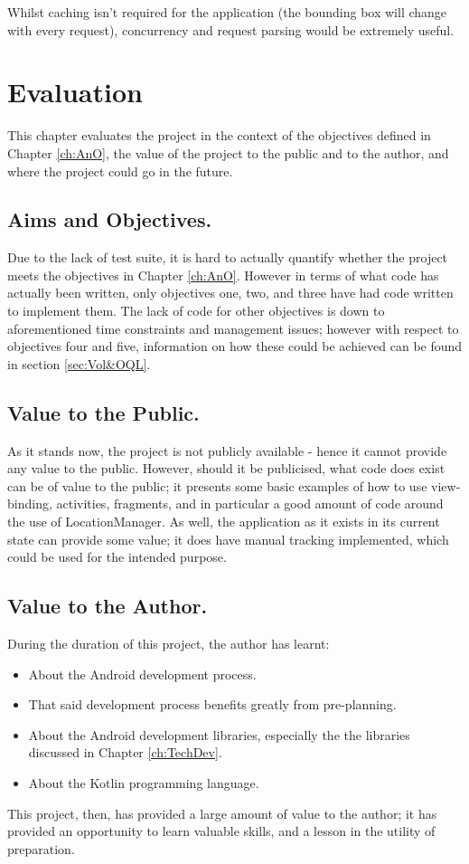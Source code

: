 \documentclass[11pt, a4paper, notitlepage]{report}
\begin{document}
Whilst caching isn't required for the application (the bounding box will change with every request), concurrency and request parsing would be extremely useful.

\chapter{Evaluation}
This chapter evaluates the project in the context of the objectives defined in Chapter \ref{ch:AnO}, the value of the project to the public and to the author, and where the project could go in the future.

\section{Aims and Objectives.}
Due to the lack of test suite, it is hard to actually quantify whether the project meets the objectives in Chapter \ref{ch:AnO}. However in terms of what code has actually been written, only objectives one, two, and three have had code written to implement them. The lack of code for other objectives is down to aforementioned time constraints and management issues; however with respect to objectives four and five, information on how these could be achieved can be found in section \ref{sec:Vol&OQL}.

\section{Value to the Public.}
As it stands now, the project is not publicly available - hence it cannot provide any value to the public. However, should it be publicised, what code does exist can be of value to the public; it presents some basic examples of how to use view-binding, activities, fragments, and in particular a good amount of code around the use of LocationManager. As well, the application as it exists in its current state can provide some value; it does have manual tracking implemented, which could be used for the intended purpose.

\section{Value to the Author.}
During the duration of this project, the author has learnt:
\begin{itemize}
	\item About the Android development process.
	\item That said development process benefits greatly from pre-planning.
	\item About the Android development libraries, especially the the libraries discussed in Chapter \ref{ch:TechDev}.
	\item About the Kotlin programming language.
\end{itemize}
This project, then, has provided a large amount of value to the author; it has provided an opportunity to learn valuable skills, and a lesson in the utility of preparation.
\end{document}
